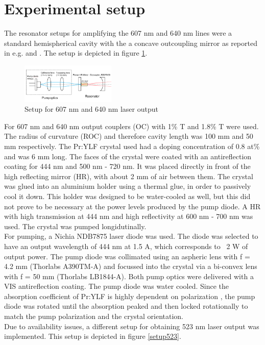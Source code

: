 \documentclass[conference]{IEEEtran}
\begin{document}
\section{Experimental setup}
The resonator setups for amplifying the 607 nm and 640 nm lines were a standard hemispherical cavity with the a concave outcoupling mirror as reported in e.g. \cite{Luo.2016} and \cite{Bellancourt.2010}. The setup is depicted in figure \ref{setup607640}.
\begin{figure}[h]
	\centering
	\includegraphics[width=0.4\textwidth]{img/setup607640}
	\caption{Setup for 607 nm and 640 nm laser output}
	\label{setup607640}
\end{figure}
For 607 nm and 640 nm output couplers (OC) with 1\% T and 1.8\% T were used. The radius of curvature (ROC) and therefore cavity length was 100 mm and 50 mm respectively. The Pr:YLF crystal used had a doping concentration of 0.8 at\% and was 6 mm long. The faces of the crystal were coated with an antireflection coating for 444 nm and 500 nm - 720 nm. It was placed directly in front of the high reflecting mirror (HR), with about 2 mm of air between them. The crystal was glued into an aluminium holder using a thermal glue, in order to passively cool it down. This holder was designed to be water-cooled as well, but this did not prove to be necessary at the power levels produced by the pump diode. A HR with high transmission at 444 nm and high reflectivity at 600 nm - 700 nm was used. The crystal was pumped longidutinally.\\
For pumping, a Nichia NDB7875 laser diode was used. The diode was selected to have an output wavelength of 444 nm at 1.5 A, which corresponds to ~2 W of output power. The pump diode was collimated using an aspheric lens with f = 4.2 mm (Thorlabs A390TM-A) and focussed into the crystal via a bi-convex lens with f = 50 mm (Thorlabs LB1844-A). Both pump optics were delivered with a VIS antireflection coating. The pump diode was water cooled. Since the absorption coefficient of Pr:YLF is highly dependent on polarization \cite{Xu.2013}, the pump diode was rotated until the absorption peaked and then locked rotationally to match the pump polarization and the crystal orientation. \\
Due to availability issues, a different setup for obtaining 523 nm laser output was implemented. This setup is depicted in figure \ref{setup523}.
\end{document}
